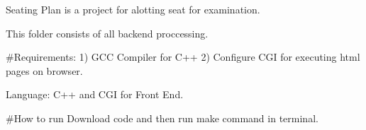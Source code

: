 Seating Plan is a project for alotting seat for examination.

This folder consists of all backend proccessing.

\#\-Requirements\-: 1) G\-C\-C Compiler for C++  2) Configure C\-G\-I for executing html pages on browser. 

Language\-: C++ and C\-G\-I for Front End. 

\#\-How to run Download code and then run make command in terminal. 